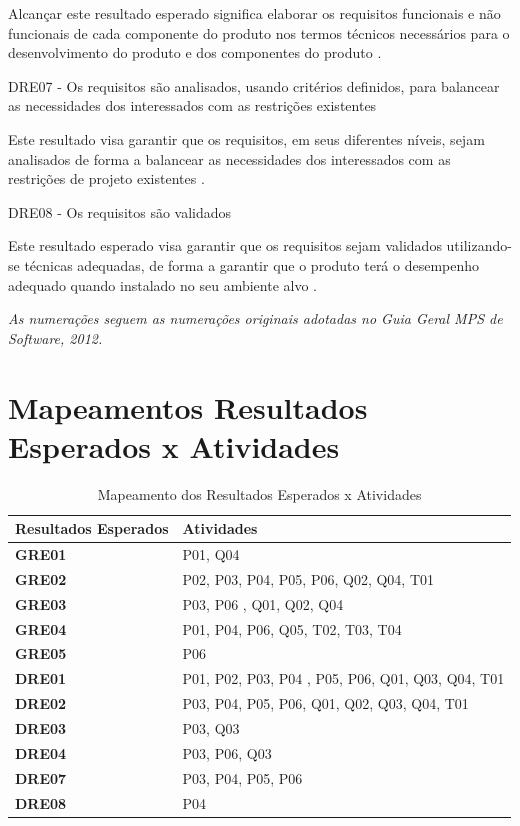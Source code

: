 	Alcançar este resultado esperado significa elaborar os requisitos funcionais e não funcionais de cada componente do
	produto nos termos técnicos necessários para o desenvolvimento do produto e dos componentes do produto \cite{guia2012}.

DRE07 - Os requisitos são analisados, usando critérios definidos, para balancear as necessidades dos interessados com as
restrições existentes

Este resultado visa garantir que os requisitos, em seus diferentes níveis, sejam analisados de forma a balancear as
necessidades dos interessados com as restrições de projeto existentes \cite{guia2012}.

DRE08 - Os requisitos são validados

	Este resultado esperado visa garantir que os requisitos sejam validados utilizando-se técnicas adequadas, de forma a
	garantir que o produto terá o desempenho adequado quando instalado no seu ambiente alvo \cite{guia2012}.

\textit{As numerações seguem as numerações originais adotadas no Guia Geral MPS de Software, 2012.}

\section{Mapeamentos Resultados Esperados x Atividades}
	\begin{table}[!h]
	\centering
	\caption{Mapeamento dos Resultados Esperados x Atividades}
	\label{my-label}
	\begin{tabular}{|l|l|}
	\hline
	\textbf{Resultados Esperados} & \textbf{Atividades}                               \\ \hline
	\textbf{GRE01}                & P01, Q04                                          \\ \hline
	\textbf{GRE02}                & P02, P03, P04, P05, P06, Q02, Q04, T01            \\ \hline
	\textbf{GRE03}                & P03, P06 , Q01, Q02, Q04                          \\ \hline
	\textbf{GRE04}                & P01, P04, P06, Q05, T02, T03, T04                 \\ \hline
	\textbf{GRE05}                & P06                                               \\ \hline
	\textbf{DRE01}                & P01, P02, P03, P04 , P05, P06, Q01, Q03, Q04, T01 \\ \hline
	\textbf{DRE02}                & P03, P04, P05, P06, Q01, Q02, Q03, Q04, T01       \\ \hline
	\textbf{DRE03}                & P03, Q03                                          \\ \hline
	\textbf{DRE04}                & P03, P06, Q03                                     \\ \hline
	\textbf{DRE07}                & P03, P04, P05, P06                                \\ \hline
	\textbf{DRE08}                & P04                                               \\ \hline
	\end{tabular}
\end{table}

